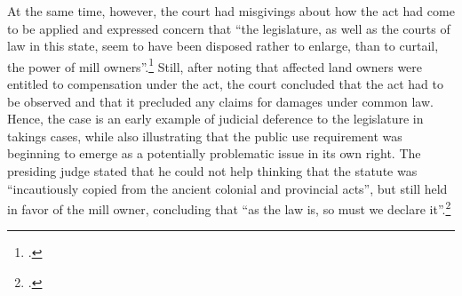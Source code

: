At the same time, however, the court had misgivings about how the act had come to be applied and expressed concern that ``the legislature, as well as the courts of law in this state, seem to have been disposed rather to enlarge, than to curtail, the power of mill owners''.\footcite[366]{stowell14} Still, after noting that affected land owners were entitled to compensation under the act, the court concluded that the act had to be observed and that it precluded any claims for damages under common law. Hence, the case is an early example of judicial deference to the legislature in takings cases, while also illustrating that the public use requirement was beginning to emerge as a potentially problematic issue in its own right. The presiding judge stated that he could not help thinking that the statute was ``incautiously copied from the ancient colonial and provincial acts'', but still held in favor of the mill owner,  concluding that ``as the law is, so must we declare it''.\footcite[368]{stowell14}

